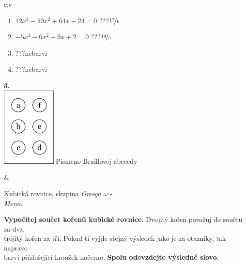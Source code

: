\documentclass[10pt]{report}
\begin{document}
\begin{tabular}{c:c}
\begin{minipage}[c][104.5mm][t]{0.5\linewidth}
\begin{center}
\begin{minipage}{0.79\linewidth}
\begin{center}
\begin{varwidth}{\linewidth}
\begin{enumerate}
\item $12x^3-50x^2+64x-24=0$\quad \dotfill\; ???\;\dotfill \quad $\nicefrac{17}{6}$
\item $-5x^3-6x^2+9x+2=0$\quad \dotfill\; ???\;\dotfill \quad $\nicefrac{14}{5}$
\item \quad \dotfill\; ???\;\dotfill \quad nebarvi
\item \quad \dotfill\; ???\;\dotfill \quad nebarvi
\end{enumerate}
\end{varwidth}
\end{center}
\end{minipage}
\begin{minipage}{0.20\linewidth}
\begin{center}
{\Huge\bfseries 3.} \\[2mm]
\includegraphics[height=40mm]{../images/braille.png}
{\small Písmeno Braillovej abecedy}
\end{center}
\end{minipage}
\end{center}
\end{minipage}
&
\begin{minipage}[c][104.5mm][t]{0.5\linewidth}
\begin{center}
\vspace{7mm}
{\huge Kubická rovnice, skupina \textit{Omega $\omega$} -}\\[5mm]
\textit{Meno:}\phantom{xxxxxxxxxxxxxxxxxxxxxxxxxxxxxxxxxxxxxxxxxxxxxxxxxxxxxxxxxxxxxxxxx}\\[5mm]
\begin{minipage}{0.95\linewidth}
\textbf{Vypočítej součet kořenů kubické rovnice.} Dvojitý kořen považuj do součtu za dva,\\trojitý kořen za tři. Pokud ti vyjde stejný výsledek jako je za otazníky, tak napravo\\barvi příslušející kroužek načerno. \textbf{Spolu odevzdejte výsledné slovo}.
\end{minipage}
\\[1mm]
\begin{minipage}{0.79\linewidth}

\end{minipage}
\end{center}
\end{minipage}
\end{tabular}
\end{document}
